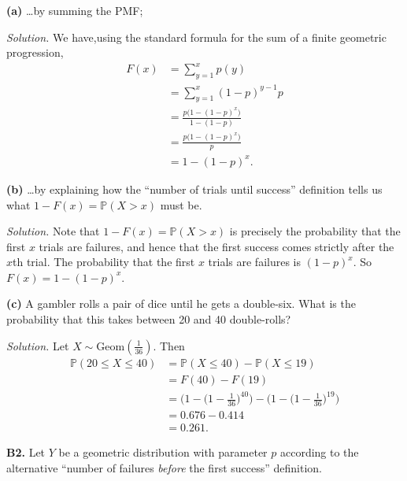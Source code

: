 \documentclass[
  a4paper,
]{book}
\theoremstyle{definition}
\theoremstyle{definition}
\theoremstyle{definition}
\theoremstyle{definition}
\theoremstyle{remark}
\begin{document}
\textbf{(a)} \ldots by summing the PMF;

\begin{myanswers}
\emph{Solution.}
We have,using the standard formula for the sum of a finite geometric progression,
\begin{align*}
F(x) &= \sum_{y = 1}^x p(y) \\
&= \sum_{y = 1}^x (1-p)^{y-1} p \\
&= \frac{p\big(1 - (1-p)^x\big)}{1 - (1-p)} \\
&= \frac{p\big(1 - (1-p)^x\big)}{p} \\
&= 1 - (1 - p)^x .
\end{align*}

\end{myanswers}

\textbf{(b)} \ldots by explaining how the ``number of trials until success'' definition tells us what \(1 - F(x) = \mathbb P(X > x)\) must be.

\begin{myanswers}
\emph{Solution.}
Note that \(1 - F(x) = \mathbb P(X > x)\) is precisely the probability that the first \(x\) trials are failures, and hence that the first success comes strictly after the \(x\)th trial. The probability that the first \(x\) trials are failures is \((1-p)^x\). So \(F(x) = 1 - (1-p)^x\).

\end{myanswers}

\textbf{(c)} A gambler rolls a pair of dice until he gets a double-six. What is the probability that this takes between 20 and 40 double-rolls?

\begin{myanswers}
\emph{Solution.}
Let \(X \sim \text{Geom}(\frac{1}{36})\). Then
\begin{align*}
\mathbb P(20 \leq X \leq 40) &= \mathbb P(X \leq 40) - \mathbb P(X \leq 19) \\
  &= F(40) - F(19) \\
  &= \bigg(1 - \big(1 - \tfrac{1}{36})^{40}\bigg) - \bigg(1 - \big(1 - \tfrac{1}{36})^{19}\bigg) \\
  &= 0.676 - 0.414 \\
  &= 0.261.
\end{align*}

\end{myanswers}

\textbf{B2.} Let \(Y\) be a geometric distribution with parameter \(p\) according to the alternative ``number of failures \emph{before} the first success'' definition.
\end{document}
